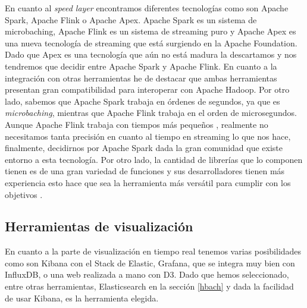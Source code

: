 En cuanto al {\em speed layer} encontramos diferentes tecnologías como
son Apache Spark, Apache Flink o Apache Apex. Apache Spark es un sistema
de microbaching, Apache Flink es un sistema de streaming puro y Apache Apex
es una nueva tecnología de streaming que está surgiendo en la Apache
Foundation. Dado que Apex es una tecnología que aún no está madura la
descartamos y nos tendremos que decidir entre Apache Spark y Apache Flink.
En cuanto a la integración con otras herramientas he de destacar que ambas
herramientas presentan gran compatibilidad para interoperar con Apache Hadoop.
Por otro lado, sabemos que Apache Spark trabaja en órdenes de segundos, 
ya que es {\em microbaching}, mientras que Apache Flink trabaja en el orden 
de microsegundos. Aunque Apache Flink trabaja con tiempos más pequeños
\cite{Hrr-4}, realmente no necesitamos tanta precisión en cuanto al tiempo
en streaming lo que nos hace, finalmente, decidirnos por Apache Spark
dada la gran comunidad que existe entorno a esta tecnología. Por otro
lado, la cantidad de librerías que lo componen tienen es de una gran variedad
de funciones y sus desarrolladores tienen más experiencia esto hace que sea
la herramienta más versátil para cumplir con los objetivos \cite{Hrr-3}.

\subsection{Herramientas de visualización\label{hvisual}}

En cuanto a la parte de visualización en tiempo real tenemos varias
posibilidades como son Kibana con el Stack de Elastic, Grafana, que
se integra muy bien con InfluxDB, o una web realizada a mano con D3. Dado que
hemos seleccionado, entre otras herramientas, Elasticsearch en la sección
\ref{hbach} y dada la facilidad de usar Kibana, es la herramienta elegida.


